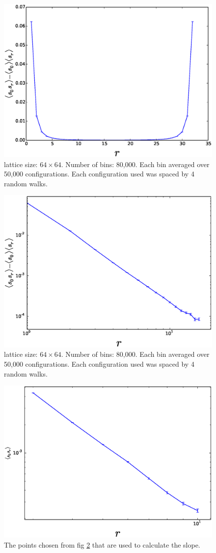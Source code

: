 \documentclass[aps,floatfix,11pt]{revtex4-1}
\begin{document}
\begin{figure}[h]
    \centering
    \includegraphics[width=8.5 cm]{dimer_dimer_cor}
    \caption{lattice size: $64\times64$. Number of bins: 80,000. Each bin averaged over 50,000
    configurations. Each configuration used was spaced by 4 random walks.\label{fig:dimer_dimer_cor}}
\end{figure}

\begin{figure}[h]
    \centering
    \includegraphics[width=8.5 cm]{dimer_dimer_cor_log}
    \caption{lattice size: $64\times64$. Number of bins: 80,000. Each bin averaged over 50,000
    configurations. Each configuration used was spaced by 4 random walks.\label{fig:dimer_dimer_cor_log}}
\end{figure}

\begin{figure}[h]
    \centering
    \includegraphics[width=8.5 cm]{fit_dm_dm_horz_ln_pnts_64x64}
    \caption{The points chosen from fig \ref{fig:dimer_dimer_cor_log} that are used to calculate the
    slope.\label{fig:fit_dm_dm_64x64}}
\end{figure}
\end{document}
